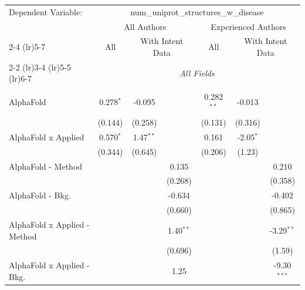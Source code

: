 \begingroup
\centering
\begin{tabular}{lcccccc}
   \tabularnewline \midrule \midrule
   Dependent Variable: & \multicolumn{6}{c}{num\_uniprot\_structures\_w\_disease}\\
 & \multicolumn{3}{c}{All Authors} & \multicolumn{3}{c}{Experienced Authors} \\
\cmidrule(lr){2-4} \cmidrule(lr){5-7}
 & \multicolumn{1}{c}{All} & \multicolumn{2}{c}{With Intent Data} & \multicolumn{1}{c}{All} & \multicolumn{2}{c}{With Intent Data} \\
\cmidrule(lr){2-2} \cmidrule(lr){3-4} \cmidrule(lr){5-5} \cmidrule(lr){6-7}
 & \multicolumn{6}{c}{\textit{All Fields}} \\ \\
   AlphaFold                      & 0.278$^{*}$   & -0.095       &                & 0.282$^{**}$  & -0.013      &   \\   
                                  & (0.144)       & (0.258)      &                & (0.131)       & (0.316)     &   \\   
   AlphaFold x Applied            & 0.570$^{*}$   & 1.47$^{**}$  &                & 0.161         & -2.05$^{*}$ &   \\   
                                  & (0.344)       & (0.645)      &                & (0.206)       & (1.23)      &   \\   
   AlphaFold - Method             &               &              & 0.135          &               &             & 0.210\\   
                                  &               &              & (0.268)        &               &             & (0.358)\\   
   AlphaFold - Bkg.               &               &              & -0.634         &               &             & -0.402\\   
                                  &               &              & (0.660)        &               &             & (0.865)\\   
   AlphaFold x Applied - Method   &               &              & 1.40$^{**}$    &               &             & -3.29$^{**}$\\   
                                  &               &              & (0.696)        &               &             & (1.59)\\   
   AlphaFold x Applied - Bkg.     &               &              & 1.25           &               &             & -9.30$^{***}$\\   

\end{tabular}
